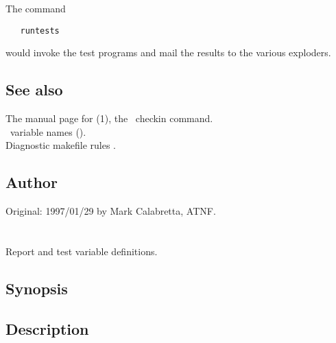 The command
 
\begin{verbatim}
   runtests
\end{verbatim}
 
\noindent
would invoke the test programs and mail the results to the various exploders.
 
\subsection*{See also}
 
The manual page for (1), the \rcs\ checkin command.\\
\aipspp\ variable names ().\\
Diagnostic makefile rules .
 
\subsection*{Author}
 
Original: 1997/01/29 by Mark Calabretta, ATNF.

 
\newpage
\section{}
\label{testdefs}


 
Report and test  variable definitions.
 
\subsection*{Synopsis}
 
\begin{synopsis}
\end{synopsis}
 
\subsection*{Description}
 
